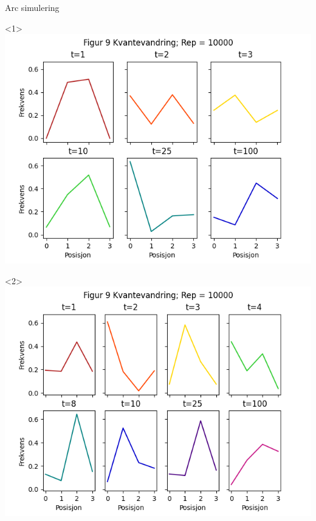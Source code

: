 \documentclass[norsk]{beamer}
\begin{document}
	\begin{frame}{Arc simulering}
			\begin{onlyenv}<1>
				\includegraphics[scale = 0.5]{Fig9Start0.png}
			\end{onlyenv}
			\begin{onlyenv}<2>
				\includegraphics[scale = 0.5]{Fig9Hadamard.png}
			\end{onlyenv}
	\end{frame}
\end{document}
